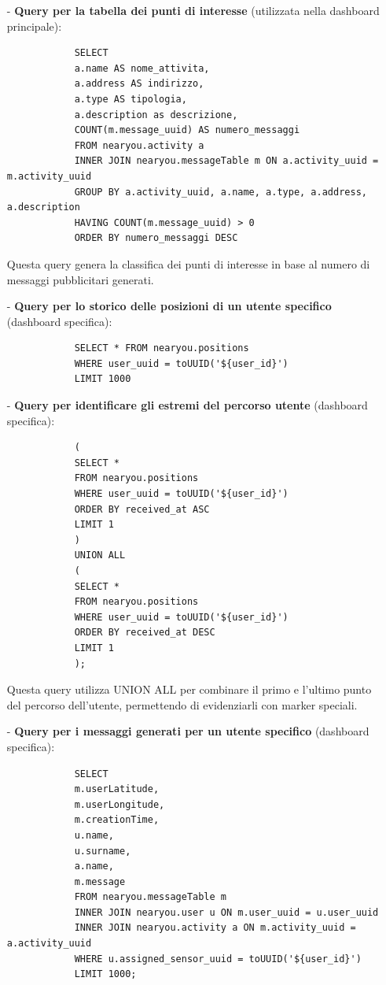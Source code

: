 \documentclass[10pt]{article}
\begin{document}
\begin{itemize}
            \item[-] \textbf{Query per la tabella dei punti di interesse} (utilizzata nella dashboard principale):
            \begin{lstlisting}
            SELECT
            a.name AS nome_attivita,
            a.address AS indirizzo,
            a.type AS tipologia,
            a.description as descrizione,
            COUNT(m.message_uuid) AS numero_messaggi
            FROM nearyou.activity a
            INNER JOIN nearyou.messageTable m ON a.activity_uuid = m.activity_uuid
            GROUP BY a.activity_uuid, a.name, a.type, a.address, a.description
            HAVING COUNT(m.message_uuid) > 0
            ORDER BY numero_messaggi DESC
            \end{lstlisting}
            Questa query genera la classifica dei punti di interesse in base al numero di messaggi pubblicitari generati.

            \item[-] \textbf{Query per lo storico delle posizioni di un utente specifico} (dashboard specifica):
            \begin{lstlisting}
            SELECT * FROM nearyou.positions
            WHERE user_uuid = toUUID('${user_id}')
            LIMIT 1000
            \end{lstlisting}

            \item[-] \textbf{Query per identificare gli estremi del percorso utente} (dashboard specifica):
            \begin{lstlisting}
            (
            SELECT *
            FROM nearyou.positions
            WHERE user_uuid = toUUID('${user_id}')
            ORDER BY received_at ASC
            LIMIT 1
            )
            UNION ALL
            (
            SELECT *
            FROM nearyou.positions
            WHERE user_uuid = toUUID('${user_id}')
            ORDER BY received_at DESC
            LIMIT 1
            );
            \end{lstlisting}
            Questa query utilizza UNION ALL per combinare il primo e l'ultimo punto del percorso dell'utente, permettendo di evidenziarli con marker speciali.

            \item[-] \textbf{Query per i messaggi generati per un utente specifico} (dashboard specifica):
            \begin{lstlisting}
            SELECT
            m.userLatitude,
            m.userLongitude,
            m.creationTime,
            u.name,
            u.surname,
            a.name,
            m.message
            FROM nearyou.messageTable m
            INNER JOIN nearyou.user u ON m.user_uuid = u.user_uuid
            INNER JOIN nearyou.activity a ON m.activity_uuid = a.activity_uuid
            WHERE u.assigned_sensor_uuid = toUUID('${user_id}')
            LIMIT 1000;
            \end{lstlisting}


\end{itemize}
\end{document}
